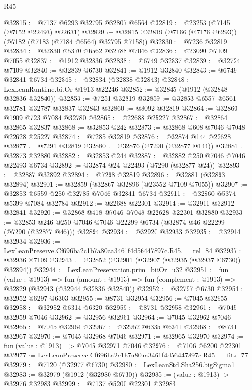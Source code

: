 \begin{lexlean}{R45}
\begin{coremodule}
{@32815 := @7137 @6293 @32795 @32807 @6564
@32819 := @23253 (@7145 (@7152 @22493) @22631)
@32829 := @32815 @32819 (@7166 (@7176 @6293)) (@7182 (@7183 (@7184 @6564) @32795 @7158))
@32830 := @7236 @32819
@32834 := @32830 @5370 @6562 @32788 @7046
@32836 := @23090 @7109 @7055
@32837 := @1912 @32836
@32838 := @6749 @32837
@32839 := @32724 @7109
@32840 := @32839 @6730
@32841 := @1912 @32840
@32843 := @6749 @32841 @6734
@32845 := @32834 (@32838 @32843)
@32848 := LexLeanRuntime.bitOr @1913 @22246
@32852 := @32845 (@1912 (@32848 @32836 @32840))
@32853 := @7251 @32819
@32859 := @32853 @6557 @6561 @32781 @32787 @32837 @32843
@32860 := @8092 @32819
@32864 := @32860 @1909 @723 @7084 @32780
@32865 := @22688 @25227
@32867 := @32864 @32865 @32837
@32868 := @32853 @242
@32873 := @32868 @608 @7046 @7048 @22628 @25227
@32874 := @7285 @32819
@32876 := @32874 @144 @22628
@32877 := @7291 @32819
@32880 := @32876 (@7290 (@32877 @144))
@32881 := @32873 @32880
@32882 := @32853 @244
@32887 := @32882 @250 @7046 @7046 @22493 @6734
@32892 := @32874 @24 @22493 (@7290 (@32877 @24))
@32893 := @32887 @32892
@32894 := @7298 @32819
@32896 := @32881 (@32893 @32894)
@32901 := @32859 (@32867 @32896 (@23552 @7109 @7055))
@32907 := @32853 @6559 @250 @32785 @7046 @32841 @6734
@32911 := @32860 @5374 @5399 @7084 @32784
@32912 := @22688 @22301
@32914 := @32911 @32912 @32841
@32920 := @32868 @418 @7046 @7048 @22628 @22301 @32880
@32933 := @32853 @246 @250 @7046 @7046 @22299 @6734 (@32874 @46 @22299 (@7290 (@32877 @46))) @32894
@32934 := @32920 @32933
@32935 := @32914 @32934
@32936 := LexLeanPreserve.Cf696ba2c1b7a80aa3461f4d56447897c.R45.__rel_84
@32937 := @32936 @7109
@32943 := @32852 (@32901 (@32907 (@32935 (@32937 @6730)) @32894))
@32944 := LexLeanPreservation.prim_bitOr_u32
@32951 := fun (value : @1913) =>
  fun (amount : @1913) => fun (complement : @1913) => @32829 (@32943 (@32944 @32836 @32840))
@32952 := @32797 @6730
@32954 := @32952 @6297 @6303
@32955 := @8731 @32954
@32956 := @7045 @32955
@32958 := @32952 @6314 @6320
@32959 := @8731 @32958
@32961 := @7045 @32959 @7046
@32962 := @32956 @32961
@32964 := @7045 @32962 @7046
@32965 := @7045 @32964
@32967 := @32952 @6335 @6341
@32968 := @8731 @32967
@32970 := @7045 @32968 @7046
@32971 := @32965 @32970
@32974 := fun (value : @1913) => @7045 @32971 @7046
@32976 := @7106 @5200 @22301
@32977 := LexLeanPreserve.Cf696ba2c1b7a80aa3461f4d56447897c.R45.__fits_77
@32979 := @7120 (@32977 @6730)
@32980 := LexLeanStd.Sha256.bigSigma1
@32983 := @32979 (@1912 (@32980 @6730))
@32985 := (value : @1913) -> @32976 @32983
@32999 := @7137
    @5200
    @22301
    @32983
}
\end{coremodule}
\end{lexlean}
